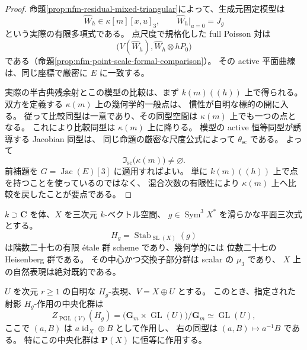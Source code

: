 \begin{proof}
命題\ref{prop:nfm-residual-mixed-triangular}によって、生成元固定模型は
\[
 \widehat W_h\in\kappa[m][x,u]_3,
 \qquad \widehat W_h|_{u=0}=J_g
\]
という実際の有限多項式である。
点尺度で規格化した full Poisson 対は
\[
 \bigl(V(\widehat W_h),\widehat W_h\otimes hP_0\bigr)
\]
である（命題\ref{prop:nfm-point-scale-formal-comparison}）。
その active 平面曲線は、同じ座標で厳密に $E$ に一致する。

実際の半古典残余射とこの模型の比較は、まず $k(m)((h))$ 上で得られる。
双方を定義する $\kappa(m)$ 上の幾何学的一般点は、
慣性が自明な標的の開に入る。
従って比較同型は一意であり、その同型空間は $\kappa(m)$ 上でも一つの点となる。
これにより比較同型は $\kappa(m)$ 上に降りる。
模型の active 恒等同型が誘導する Jacobian 同型は、
同じ命題の厳密な尺度公式によって $\theta_{\mathrm{sc}}$ である。
よって
\[
 \mathfrak I_{\mathrm{sc}}\bigl(\kappa(m)\bigr)\ne\varnothing.
\]
前補題を $G=\operatorname{Jac}(E)[3]$ に適用すればよい。
単に $k(m)((h))$ 上で点を持つことを使っているのではなく、
混合次数の有限性により $\kappa(m)$ 上へ比較を戻したことが要点である。
\end{proof}

\begin{lemma}
\label{lem:nfm-heisenberg-ambient-centralizer}
$k\supset\mathbf C$ を体、$X$ を三次元 $k$-ベクトル空間、
$g\in\operatorname{Sym}^3X^*$ を滑らかな平面三次式とする。
\[
 H_g=\operatorname{Stab}_{\operatorname{SL}(X)}(g)
\]
は階数二十七の有限 étale 群 scheme であり、幾何学的には
位数二十七の Heisenberg 群である。
その中心かつ交換子部分群は scalar の $\mu_3$ であり、
$X$ 上の自然表現は絶対既約である。

$U$ を次元 $r\ge1$ の自明な $H_g$-表現、$V=X\oplus U$ とする。
このとき、指定された射影 $H_g$-作用の中央化群は
\begin{equation}\label{eq:nfm-heisenberg-ambient-centralizer}
 Z_{\operatorname{PGL}(V)}(H_g)
 =\bigl(\mathbf G_m\times\operatorname{GL}(U)\bigr)/\mathbf G_m
 \simeq\operatorname{GL}(U),
\end{equation}
ここで $(a,B)$ は $a\operatorname{id}_X\oplus B$ として作用し、
右の同型は $(a,B)\mapsto a^{-1}B$ である。
特にこの中央化群は $\mathbf P(X)$ に恒等に作用する。
\end{lemma}

